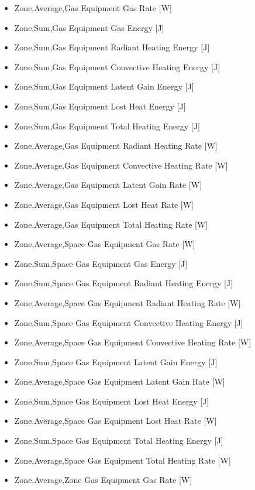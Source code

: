 \begin{itemize}
\item
  Zone,Average,Gas Equipment Gas Rate {[}W{]}
\item
  Zone,Sum,Gas Equipment Gas Energy {[}J{]}
\item
  Zone,Sum,Gas Equipment Radiant Heating Energy {[}J{]}
\item
  Zone,Sum,Gas Equipment Convective Heating Energy {[}J{]}
\item
  Zone,Sum,Gas Equipment Latent Gain Energy {[}J{]}
\item
  Zone,Sum,Gas Equipment Lost Heat Energy {[}J{]}
\item
  Zone,Sum,Gas Equipment Total Heating Energy {[}J{]}
\item
  Zone,Average,Gas Equipment Radiant Heating Rate {[}W{]}
\item
  Zone,Average,Gas Equipment Convective Heating Rate {[}W{]}
\item
  Zone,Average,Gas Equipment Latent Gain Rate {[}W{]}
\item
  Zone,Average,Gas Equipment Lost Heat Rate {[}W{]}
\item
  Zone,Average,Gas Equipment Total Heating Rate {[}W{]}
\item
  Zone,Average,Space Gas Equipment Gas Rate {[}W{]}
\item
  Zone,Sum,Space Gas Equipment Gas Energy {[}J{]}
\item
  Zone,Sum,Space Gas Equipment Radiant Heating Energy {[}J{]}
\item
  Zone,Average,Space Gas Equipment Radiant Heating Rate {[}W{]}
\item
  Zone,Sum,Space Gas Equipment Convective Heating Energy {[}J{]}
\item
  Zone,Average,Space Gas Equipment Convective Heating Rate {[}W{]}
\item
  Zone,Sum,Space Gas Equipment Latent Gain Energy {[}J{]}
\item
  Zone,Average,Space Gas Equipment Latent Gain Rate {[}W{]}
\item
  Zone,Sum,Space Gas Equipment Lost Heat Energy {[}J{]}
\item
  Zone,Average,Space Gas Equipment Lost Heat Rate {[}W{]}
\item
  Zone,Sum,Space Gas Equipment Total Heating Energy {[}J{]}
\item
  Zone,Average,Space Gas Equipment Total Heating Rate {[}W{]}
\item
  Zone,Average,Zone Gas Equipment Gas Rate {[}W{]}

\end{itemize}
